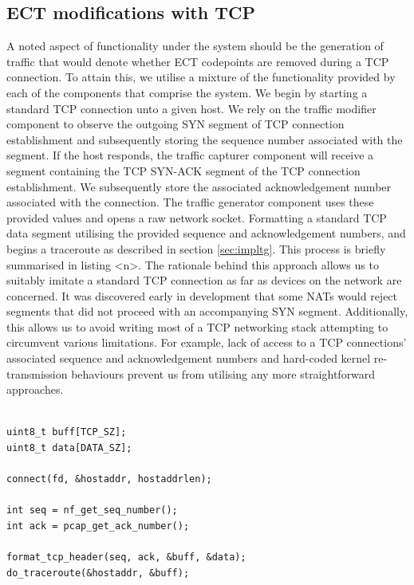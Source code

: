 \documentclass{l4proj}
\begin{document}
\subsection{ECT modifications with TCP}


A noted aspect of functionality under the system should be the generation of traffic that would denote whether ECT codepoints are removed during a TCP connection. To attain this, we utilise a mixture of the functionality provided by each of the components that comprise the system. We begin by starting a standard TCP connection unto a given host. We rely on the traffic modifier component to observe the outgoing SYN segment of TCP connection establishment and subsequently storing the sequence number associated with the segment. If the host responds, the traffic capturer component will receive a segment containing the TCP SYN-ACK segment of the TCP connection establishment. We subsequently store the associated acknowledgement number associated with the connection. The traffic generator component uses these provided values and opens a raw network socket. Formatting a standard TCP data segment utilising the provided sequence and acknowledgement numbers, and begins a traceroute as described in section \ref{sec:impltg}. This process is briefly summarised in listing <n>. The rationale behind this approach allows us to suitably imitate a standard TCP connection as far as devices on the network are concerned. It was discovered early in development that some NATs would reject segments that did not proceed with an accompanying SYN segment. Additionally, this allows us to avoid writing most of a TCP networking stack attempting to circumvent various limitations. For example, lack of access to a TCP connections' associated sequence and acknowledgement numbers and hard-coded kernel re-transmission behaviours prevent us from utilising any more straightforward approaches.

\begin{lstlisting}[caption={A demonstration of launching traceroutes during a TCP connection, implementation details such as the use of synchronisation primitives and error checking have been omitted for the sake of brevity}]

uint8_t buff[TCP_SZ];
uint8_t data[DATA_SZ];

connect(fd, &hostaddr, hostaddrlen);

int seq = nf_get_seq_number();
int ack = pcap_get_ack_number();

format_tcp_header(seq, ack, &buff, &data);
do_traceroute(&hostaddr, &buff);

\end{lstlisting}
\end{document}
